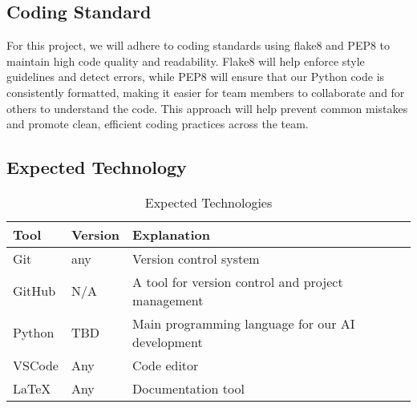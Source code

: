 \documentclass{article}
\begin{document}
\subsection{Coding Standard}
For this project, we will adhere to coding standards using flake8 and PEP8 to 
maintain high code quality and readability. Flake8 will help enforce style 
guidelines and detect errors, while PEP8 will ensure that our Python code is 
consistently formatted, making it easier for team members to collaborate and 
for others to understand the code. This approach will help prevent common 
mistakes and promote clean, efficient coding practices across the team.

\subsection{Expected Technology}



\begin{table}[h!]
    \centering
    \begin{tabular}{|l|l|l|}
    \hline
    \textbf{Tool}   & \textbf{Version} & \textbf{Explanation }                                         \\
    \hline
    Git   & any  & Version control system                                   \\
    \hline
    GitHub & N/A     & A tool for version control and project management    \\
    \hline
    Python & TBD     & Main programming language for our AI development     \\
    \hline
    VSCode & Any     & Code editor                                          \\
    \hline              
    LaTeX  & Any     & Documentation tool                                   \\
    \hline
    \end{tabular}
    \caption{Expected Technologies}
\end{table}
\end{document}
